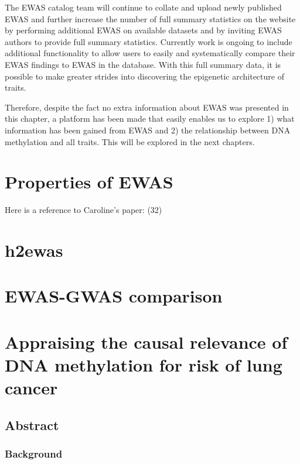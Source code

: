 \documentclass[11pt,twoside]{bristolthesis}
\begin{document}
The EWAS catalog team will continue to collate and upload newly published EWAS and further increase the number of full summary statistics on the website by performing additional EWAS on available datasets and by inviting EWAS authors to provide full summary statistics. Currently work is ongoing to include additional functionality to allow users to easily and systematically compare their EWAS findings to EWAS in the database. With this full summary data, it is possible to make greater strides into discovering the epigenetic architecture of traits.

Therefore, despite the fact no extra information about EWAS was presented in this chapter, a platform has been made that easily enables us to explore 1) what information has been gained from EWAS and 2) the relationship between DNA methylation and all traits. This will be explored in the next chapters.

\hypertarget{properties-of-ewas}{%
\chapter{Properties of EWAS}\label{properties-of-ewas}}

Here is a reference to Caroline's paper: (32)

\hypertarget{h2ewas-chapter}{%
\chapter{h2ewas}\label{h2ewas-chapter}}

\hypertarget{ewas-gwas-comp-chapter}{%
\chapter{EWAS-GWAS comparison}\label{ewas-gwas-comp-chapter}}

\hypertarget{dnam-lung-cancer-mr}{%
\chapter{Appraising the causal relevance of DNA methylation for risk of lung cancer}\label{dnam-lung-cancer-mr}}

\hypertarget{abstract-1}{%
\section{Abstract}\label{abstract-1}}

\hypertarget{background}{%
\subsection{Background}\label{background}}
\end{document}
